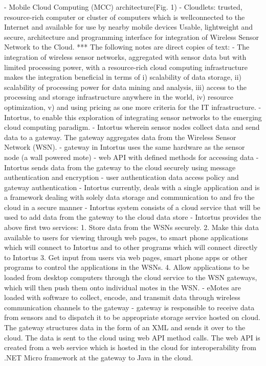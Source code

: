 				- Mobile Cloud Computing (MCC) architecture(Fig. 1)
				- Cloudlets: trusted, resource-rich computer or cluster of computers which is wellconnected
to the Internet and available for use by nearby mobile devices
			Usable, lightweight and secure, architecture and programming interface for integration of Wireless Sensor Network to the Cloud.
				*** The following notes are direct copies of text:
				- The integration of wireless sensor networks, aggregated with sensor data but with limited processing power, with a resource-rich cloud computing infrastructure makes the integration beneficial in terms of i) scalability of data storage, ii) scalability of processing power for data mining and analysis, iii) access to the processing and storage infrastructure anywhere in the world, iv) resource optimization, v) and using pricing as one more criteria for the IT infrastructure.
				- Intortus, to enable this exploration of integrating sensor networks to the emerging cloud computing paradigm.
				- Intortus wherein sensor nodes collect data and send data to a gateway. The gateway aggregates data from the Wireless Sensor Network (WSN).
				- gateway in Intortus uses the same hardware as the sensor node (a wall powered mote)
				- web API with defined methods for accessing data
				- Intortus sends data from the gateway to the cloud securely using message authentication and encryption
				- user authentication data access policy and gateway authentication
				- Intortus currently, deals with a single application and is a framework dealing with solely data storage and communication to and fro the cloud in a secure manner
				- Intortus system consists of a cloud service that will be used to add data from the gateway to the cloud data store
				- Intortus provides the above first two services:
					1. Store data from the WSNs securely.
					2. Make this data available to users for viewing through web pages, to smart phone applications which will connect to Intortus and to other programs which will connect directly to Intortus
					3. Get input from users via web pages, smart phone apps or other programs to control the applications in the WSNs.
					4. Allow applications to be loaded from desktop computers through the cloud service to the WSN gateways, which will then push them onto individual motes in the WSN.
				- eMotes are loaded with software to collect, encode, and transmit data through wireless communication channels to the gateway
				- gateway is responsible to receive data from sensors and to dispatch it to be appropriate storage service hosted on cloud. The gateway structures data in the form of an XML and sends it over to the cloud. The data is sent to the cloud using web API method calls. The web API is created from a web service which is hosted in the cloud for interoperability from .NET Micro framework at the gateway to Java in the cloud.
